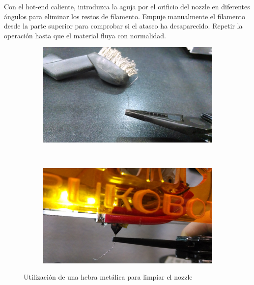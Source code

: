 \documentclass[11pt,a4paper]{article}
\begin{document}
Con el hot-end caliente, introduzca la aguja por el orificio del nozzle en diferentes ángulos para eliminar los restos de filamento. Empuje manualmente el filamento desde la parte superior para comprobar si el atasco ha desaparecido. Repetir la operación hasta que el material fluya con normalidad.\begin{figure}[H]
    \centering
    \begin{subfigure}[b]{0.45\textwidth}
        \includegraphics[width=\textwidth,cfbox=azul_marcos 4pt 0pt]{FOTOS/CEPILLO1}
    \end{subfigure}
    ~ %
    \quad
    \begin{subfigure}[b]{0.45\textwidth}
        \includegraphics[width=\textwidth,cfbox=azul_marcos 4pt 0pt]{FOTOS/CEPILLO2}
    \end{subfigure}
    \caption*{Utilización de una hebra metálica para limpiar el nozzle}
\end{figure}
\end{document}
